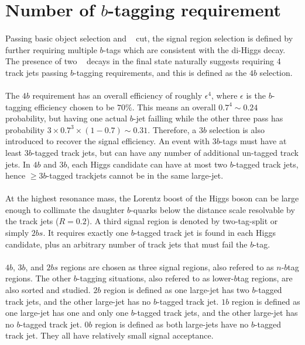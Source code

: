 \section{Number of $b$-tagging requirement}
\paragraph{}
Passing basic object selection and \Xhh~ cut, the signal region selection is defined by further requiring multiple $b$-tags which are consistent with the di-Higgs decay. 
The presence of two \hbb~ decays in the final state naturally suggests requiring 4 track jets passing $b$-tagging requirements, and this is defined as the  $4b$ selection.

\paragraph{}
The $4b$ requirement has an overall efficiency of roughly $\epsilon^4$, where $\epsilon$ is the $b$-tagging efficiency chosen to be $70\%$.
This means an overall $0.7^4 \sim 0.24$ probability, but having one actual $b$-jet failling while the other three pass has probability $3 \times 0.7^3 \times (1-0.7) \sim 0.31$.
Therefore, a $3b$ selection is also introduced to recover the signal efficiency. 
An event with $3b$-tags must have at least $3b$-tagged track jets, but can have any number of additional un-tagged track jets.
In $4b$ and $3b$, each Higgs candidate can have at most two $b$-tagged track jets, hence $\geq 3b$-tagged trackjets cannot be in the same large-\R jet.

\paragraph{}
At the highest resonance mass, the Lorentz boost of the Higgs boson can be large enough to collimate the daughter $b$-quarks below the distance scale resolvable by the track jets ($R=0.2$). A third signal region is denoted by two-tag-split or simply $2bs$.
It requires exactly one $b$-tagged track jet is found in each Higgs candidate, plus an arbitrary number of track jets that must fail the $b$-tag.

\paragraph{}
$4b$, $3b$, and $2bs$ regions are chosen as three signal regions, also refered to as $n$-$b$tag regions.
The other $b$-tagging situations, also refered to as lower-$b$tag regions, are also sorted and studied.
$2b$ region is defined as one large-\R jet has two $b$-tagged track jets, and the other large-\R jet has no $b$-tagged track jet. 
$1b$ region is defined as one large-\R jet has one and only one $b$-tagged track jets, and the other large-\R jet has no $b$-tagged track jet. 
$0b$ region is defined as both large-\R jets have no $b$-tagged track jet. 
They all have relatively small signal acceptance. 

